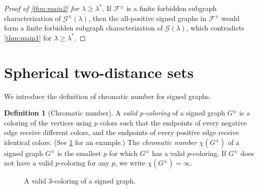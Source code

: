\documentclass[11pt]{article}
\theoremstyle{definition}
\newtheorem{definition}[theorem]{Definition}
\theoremstyle{remark}
\newcommand{\la}{\lambda}
\newcommand{\F}{\mathcal{F}}
\newcommand{\G}{\mathcal{G}}
\newcommand{\Gl}{\G(\la)}
\newcommand{\Gs}{\G^\pm(\la)}
\begin{document}
\begin{proof}[Proof of \cref{thm:main2} for $\la \ge \la^*$]
    If $\F^\pm$ is a finite forbidden subgraph characterization of $\Gs$, then the all-positive signed graphs in $\F^\pm$ would form a finite forbidden subgraph characterization of $\Gl$, which contradicts \cref{thm:main1} for $\la \ge \la^*$.
\end{proof}

\section{Spherical two-distance sets} \label{sec:app}

We introduce the definition of chromatic number for signed graphs.

\begin{definition}[Chromatic number] \label{def:chromatic}
    A \emph{valid $p$-coloring} of a signed graph $G^\pm$ is a coloring of the vertices using $p$ colors such that the endpoints of every negative edge receive different colors, and the endpoints of every positive edge receive identical colors. (See \cref{fig:coloring} for an example.) The \emph{chromatic number} $\chi(G^\pm)$ of a signed graph $G^\pm$ is the smallest $p$ for which $G^\pm$ has a valid $p$-coloring. If $G^\pm$ does not have a valid $p$-coloring for any $p$, we write $\chi(G^\pm) = \infty$.
\end{definition}

\begin{figure}[t]
    \centering
    \caption{A valid $3$-coloring of a signed graph.} \label{fig:coloring}
\end{figure}
\end{document}
